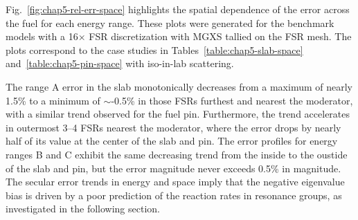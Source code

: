 Fig.~\ref{fig:chap5-rel-err-space} highlights the spatial dependence of the error across the fuel for each energy range. These plots were generated for the benchmark models with a 16$\times$ \ac{FSR} discretization with \ac{MGXS} tallied on the \ac{FSR} mesh. The plots correspond to the case studies in Tables~\ref{table:chap5-slab-space} and~\ref{table:chap5-pin-space} with iso-in-lab scattering.

The range A error in the slab monotonically decreases from a maximum of nearly 1.5\% to a minimum of $\sim$-0.5\% in those \ac{FSR}s furthest and nearest the moderator, with a similar trend observed for the fuel pin. Furthermore,  the trend accelerates in outermost 3--4 \ac{FSR}s nearest the moderator, where the error drops by nearly half of its value at the center of the slab and pin. The error profiles for energy ranges B and C exhibit the same decreasing trend from the inside to the oustide of the slab and pin, but the error magnitude never exceeds 0.5\% in magnitude. The secular error trends in energy and space imply that the negative eigenvalue bias is driven by a poor prediction of the reaction rates in resonance groups, as investigated in the following section.

